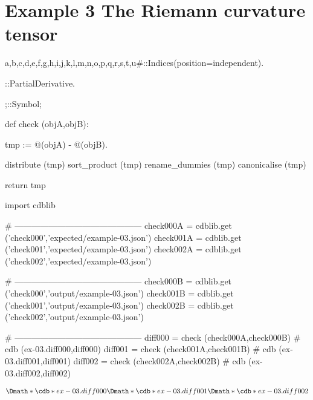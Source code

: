 \documentclass[12pt]{cdblatex}
\begin{document}
\section*{Example 3 The Riemann curvature tensor}


\begin{cadabra}
   {a,b,c,d,e,f,g,h,i,j,k,l,m,n,o,p,q,r,s,t,u#}::Indices(position=independent).

   \partial{#}::PartialDerivative.

   ;::Symbol;

   def check (objA,objB):

       tmp := @(objA) - @(objB).

       distribute     (tmp)
       sort_product   (tmp)
       rename_dummies (tmp)
       canonicalise   (tmp)

       return tmp

   import cdblib

   # ---------------------------------------------
   check000A = cdblib.get ('check000','expected/example-03.json')
   check001A = cdblib.get ('check001','expected/example-03.json')
   check002A = cdblib.get ('check002','expected/example-03.json')

   # ---------------------------------------------
   check000B = cdblib.get ('check000','output/example-03.json')
   check001B = cdblib.get ('check001','output/example-03.json')
   check002B = cdblib.get ('check002','output/example-03.json')

   # ---------------------------------------------
   diff000 = check (check000A,check000B)   # cdb (ex-03.diff000,diff000)
   diff001 = check (check001A,check001B)   # cdb (ex-03.diff001,diff001)
   diff002 = check (check002A,check002B)   # cdb (ex-03.diff002,diff002)

\end{cadabra}


\begin{dgroup*}
   \Dmath*{\cdb*{ex-03.diff000}}
   \Dmath*{\cdb*{ex-03.diff001}}
   \Dmath*{\cdb*{ex-03.diff002}}
\end{dgroup*}
\end{document}
